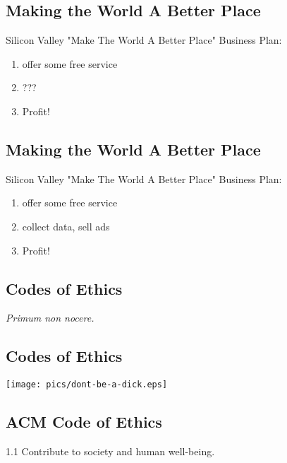 \documentclass[xga]{xdvislides}
\begin{document}
\subsection{Making the World A Better Place}
Silicon Valley "Make The World A Better Place"
Business Plan:

\vspace*{\fill}
\begin{enumerate}
	\item offer some free service
	\item ???
	\item Profit!
\end{enumerate}
\vspace*{\fill}

\subsection{Making the World A Better Place}
Silicon Valley "Make The World A Better Place"
Business Plan:

\vspace*{\fill}
\begin{enumerate}
	\item offer some free service
	\item collect data, sell ads
	\item Profit!
\end{enumerate}
\vspace*{\fill}

\subsection{Codes of Ethics}
\Huge
\vspace*{\fill}
\begin{center}
	{\em Primum non nocere.}
\end{center}
\vspace*{\fill}
\Normalsize

\subsection{Codes of Ethics}
\vspace*{\fill}
\begin{center}
	\texttt{[image: pics/dont-be-a-dick.eps]}
\end{center}
\vspace*{\fill}

\subsection{ACM Code of Ethics}
\Huge
\vspace*{\fill}
\begin{center}
1.1 Contribute to society and human well-being.
\end{center}
\vspace*{\fill}
\Normalsize
\end{document}
